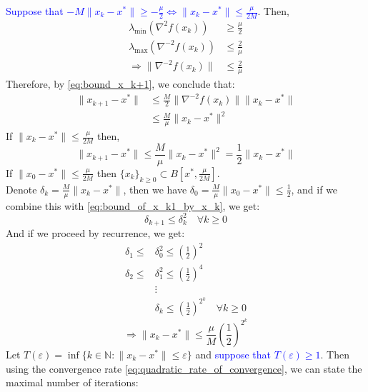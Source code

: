 \documentclass[12pt, openany]{report}
\newcommand{\N}{\mathbb{N}}
\theoremstyle{definition}
\begin{document}
\textcolor{blue}{Suppose that $-M \|x_k-x^*\| \geq - \frac{\mu}{2} \Leftrightarrow \|x_k-x^*\| \leq \frac{\mu}{2M}$}. Then,
\begin{equation}
	\begin{aligned}
		\lambda_{\min}(\nabla^2 f(x_k)) &\geq \frac{\mu}{2}\\
		\lambda_{\max}(\nabla^{-2} f(x_k)) &\leq \frac{2}{\mu}\\
		\Rightarrow \|\nabla^{-2} f(x_k)\| &\leq \frac{2}{\mu}
	\end{aligned}
\end{equation}
Therefore, by \eqref{eq:bound_x_k+1}, we conclude that:
\begin{equation}
	\begin{aligned}
		\|x_{k+1}-x^*\| &\leq \frac{M}{2}\|\nabla^{-2}f(x_k)\|\|x_k-x^*\|\\
		&\leq \frac{M}{\mu}\|x_k-x^*\|^2
	\end{aligned}
\end{equation}
If $\|x_k-x^*\| \leq \frac{\mu}{2M}$ then,
\begin{equation}\label{eq:bound_of_x_k1_by_x_k}
	\|x_{k+1}-x^*\| \leq \frac{M}{\mu} \|x_k - x^*\|^2 = \frac{1}{2} \|x_k - x^*\|
\end{equation}
If $\|x_0-x^*\| \leq \frac{\mu}{2M}$ then $\{x_k\}_{k\geq0} \subset B[x^*,\frac{\mu}{2M}]$.\\
Denote $\delta_k = \frac{M}{\mu} \|x_k-x^*\|$, then we have $\delta_0 = \frac{M}{\mu} \|x_0-x^*\| \leq \frac{1}{2}$, and if we combine this with \eqref{eq:bound_of_x_k1_by_x_k}, we get:
\begin{equation}
	\delta_{k+1} \leq \delta_k^2 \quad \forall k \geq 0
\end{equation}
And if we proceed by recurrence, we get:
\begin{equation}
	\begin{aligned}
		\delta_1 \leq &\delta_0^2 \leq \left(\frac{1}{2}\right)^2\\
		\delta_2 \leq &\delta_1^2 \leq \left(\frac{1}{2}\right)^4\\
		&\vdots\\
		&\delta_k \leq \left(\frac{1}{2}\right)^{2^k} \quad \forall k \geq 0
	\end{aligned}
\end{equation}
\begin{equation}\label{eq:quadratic_rate_of_convergence}
	\Rightarrow \|x_k-x^*\|\leq \frac{\mu}{M} \left(\frac{1}{2}\right)^{2^k}
\end{equation}
Let $T(\varepsilon) = \inf\{k\in\N: \|x_k-x^*\|\leq \varepsilon\}$ and \textcolor{blue}{suppose that $T(\varepsilon) \geq 1$}. Then using the convergence rate \eqref{eq:quadratic_rate_of_convergence}, we can state the maximal number of iterations:
\end{document}
